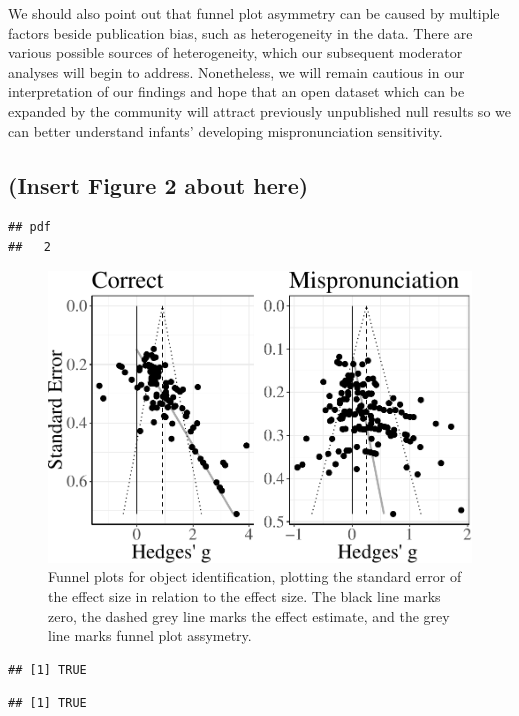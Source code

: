 \documentclass[man]{apa6}
\theoremstyle{definition}
\theoremstyle{definition}
\theoremstyle{definition}
\theoremstyle{remark}
\begin{document}
We should also point out that funnel plot asymmetry can be caused by
multiple factors beside publication bias, such as heterogeneity in the
data. There are various possible sources of heterogeneity, which our
subsequent moderator analyses will begin to address. Nonetheless, we
will remain cautious in our interpretation of our findings and hope that
an open dataset which can be expanded by the community will attract
previously unpublished null results so we can better understand infants'
developing mispronunciation sensitivity.

\subsection{(Insert Figure 2 about
here)}\label{insert-figure-2-about-here}

\begin{verbatim}
## pdf 
##   2
\end{verbatim}

\begin{figure}
\centering
\includegraphics{Paper_Analyses_files/figure-latex/FunnelCombo-1.pdf}
\caption{\label{fig:FunnelCombo}Funnel plots for object identification,
plotting the standard error of the effect size in relation to the effect
size. The black line marks zero, the dashed grey line marks the effect
estimate, and the grey line marks funnel plot assymetry.}
\end{figure}

\begin{verbatim}
## [1] TRUE
\end{verbatim}

\begin{verbatim}
## [1] TRUE
\end{verbatim}
\end{document}
